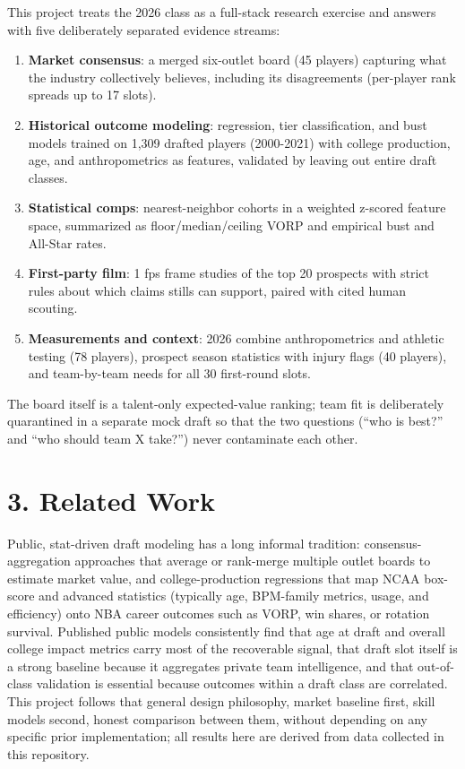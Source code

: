 \documentclass[
  10pt,
]{article}
\providecommand{\tightlist}{%
  \setlength{\itemsep}{0pt}\setlength{\parskip}{0pt}}
\begin{document}
This project treats the 2026 class as a full-stack research exercise and answers
with five deliberately separated evidence streams:

\begin{enumerate}
\def\labelenumi{\arabic{enumi}.}
\tightlist
\item
  \textbf{Market consensus}: a merged six-outlet board (45 players) capturing
  what the industry collectively believes, including its disagreements
  (per-player rank spreads up to 17 slots).
\item
  \textbf{Historical outcome modeling}: regression, tier classification, and
  bust models trained on 1,309 drafted players (2000-2021) with college
  production, age, and anthropometrics as features, validated by leaving out
  entire draft classes.
\item
  \textbf{Statistical comps}: nearest-neighbor cohorts in a weighted z-scored
  feature space, summarized as floor/median/ceiling VORP and empirical bust and
  All-Star rates.
\item
  \textbf{First-party film}: 1 fps frame studies of the top 20 prospects with
  strict rules about which claims stills can support, paired with cited human
  scouting.
\item
  \textbf{Measurements and context}: 2026 combine anthropometrics and athletic
  testing (78 players), prospect season statistics with injury flags (40
  players), and team-by-team needs for all 30 first-round slots.
\end{enumerate}

The board itself is a talent-only expected-value ranking; team fit is
deliberately quarantined in a separate mock draft so that the two questions
(``who is best?'' and ``who should team X take?'') never contaminate each other.

\section{3. Related Work}\label{related-work}

Public, stat-driven draft modeling has a long informal tradition:
consensus-aggregation approaches that average or rank-merge multiple outlet
boards to estimate market value, and college-production regressions that map
NCAA box-score and advanced statistics (typically age, BPM-family metrics,
usage, and efficiency) onto NBA career outcomes such as VORP, win shares, or
rotation survival. Published public models consistently find that age at draft
and overall college impact metrics carry most of the recoverable signal, that
draft slot itself is a strong baseline because it aggregates private team
intelligence, and that out-of-class validation is essential because outcomes
within a draft class are correlated. This project follows that general design
philosophy, market baseline first, skill models second, honest comparison
between them, without depending on any specific prior implementation; all
results here are derived from data collected in this repository.
\end{document}
